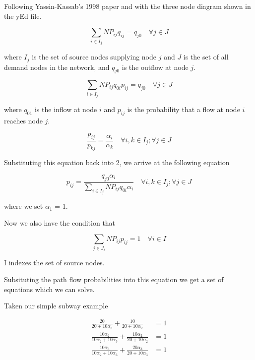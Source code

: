 \documentclass{article}
\begin{document}
Following Yassin-Kassab's 1998 paper and with the three node diagram shown in 
the yEd file.

\begin{equation}
\sum_{i\in I_j} NP_{ij}q_{ij} = q_{j0}\quad \forall j \in J
\end{equation}

where $I_j$ is the set of source nodes supplying node $j$ and $J$ is
the set of all demand nodes in the network, and $q_{j0}$ is the
outflow at node $j$.

\begin{equation}
\sum_{i \in I_j} NP_{ij}q_{0i}p_{ij} = q_{j0}\quad \forall j \in J
\end{equation}

where $q_{01}$ is the inflow at node $i$ and $p_{ij}$ is the probability
that a flow at node $i$ reaches node $j$.




\begin{equation}
\frac{p_{ij}}{p_{kj}} = \frac{\alpha_i}{\alpha_k}\quad \forall i,k \in I_j; \forall j \in J
\end{equation}

Substituting this equation back into 2, we arrive at the following equation

\begin{equation}
p_{ij} = \frac{q_{j0}\alpha_i}{\sum_{i\in I_j} NP_{ij}q_{0i}\alpha_i}\quad \forall i,k \in I_j; \forall j \in J
\end{equation}

where we set $\alpha_1$ = 1.

Now we also have the condition that

\begin{equation}
\sum_{j\in J_i} NP_{ij}p_{ij} = 1\quad \forall i \in I
\end{equation}

I indexes the set of source nodes.

Subsituting the path flow probabilities into this equation we get a
set of equations which we can solve.

Taken our simple subway example

\begin{align}
\frac{20}{20 + 10\alpha_3} + \frac{10}{20 + 10\alpha_2} &= 1 \\
\frac{10\alpha_2}{10\alpha_2 + 10\alpha_3} + \frac{10\alpha_2}{20 + 10\alpha_2} &= 1 \\
\frac{10\alpha_3}{10\alpha_2 + 10\alpha_3} + \frac{20\alpha_3}{20 + 10\alpha_3} &= 1
\end{align}
\end{document}

